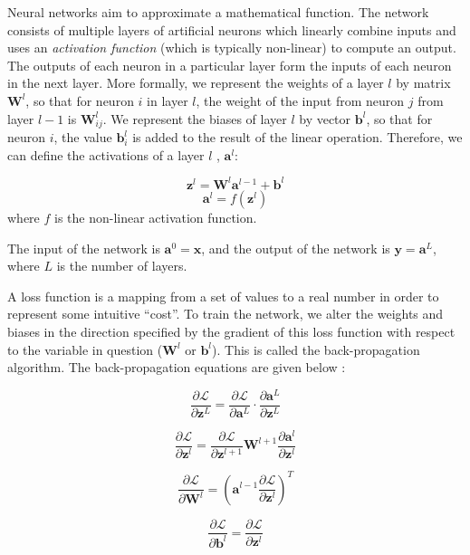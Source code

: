 Neural networks aim to approximate a mathematical function. The network consists of multiple layers of artificial neurons which linearly combine inputs and uses an \textit{activation function} (which is typically non-linear) to compute an output. The outputs of each neuron in a particular layer form the inputs of each neuron in the next layer. More formally, we represent the weights of a layer $l$ by matrix $\boldsymbol{W}^l$, so that for neuron $i$ in layer $l$, the weight of the input from neuron $j$ from layer $l-1$ is $\boldsymbol{W}^l_{ij}$. We represent the biases of layer $l$ by vector $\boldsymbol{b}^l$, so that for neuron $i$, the value $\boldsymbol{b}^l_i$ is added to the result of the linear operation. Therefore, we can define the activations of a layer $l$ \cite{csmlnotes}, $\boldsymbol{a}^{l}$:

\[
\boldsymbol{z}^l = \boldsymbol{W}^l \boldsymbol{a}^{l-1} + \boldsymbol{b}^l
\]
\[
\boldsymbol{a}^{l} = f(\boldsymbol{z}^{l})
\]
where $f$ is the non-linear activation function.

The input of the network is $\boldsymbol{a}^0 = \boldsymbol{x}$, and the output of the network is $\boldsymbol{y} = \boldsymbol{a}^L$, where $L$ is the number of layers.

A loss function is a mapping from a set of values to a real number in order to represent some intuitive ``cost''. To train the network, we alter the weights and biases in the direction specified by the gradient of this loss function with respect to the variable in question ($\boldsymbol{W}^l$ or $\boldsymbol{b}^l$). This is called the back-propagation algorithm. The back-propagation equations are given below \cite{csmlnotes}:

\[\frac{\partial \mathcal{L}}{\partial \boldsymbol{z}^L} =\frac{\partial \mathcal{L}}{\partial \boldsymbol{a}^L} \cdot \frac{\partial \boldsymbol{a}^L}{\partial \boldsymbol{z}^L}\]

\[\frac{\partial \mathcal{L}}{\partial \boldsymbol{z}^l} = \frac{\partial \mathcal{L}}{\partial \boldsymbol{z}^{l+1}} \boldsymbol{W}^{l+1} \frac{\partial \boldsymbol{a}^l}{\partial \boldsymbol{z}^{l}}\]

\[\frac{\partial \mathcal{L}}{\partial \boldsymbol{W}^l} = (\boldsymbol{a}^{l-1} \frac{\partial \mathcal{L}}{\partial \boldsymbol{z}^l} )^T\]

\[\frac{\partial \mathcal{L}}{\partial \boldsymbol{b}^l} =\frac{\partial \mathcal{L}}{\partial \boldsymbol{z}^l}\]



